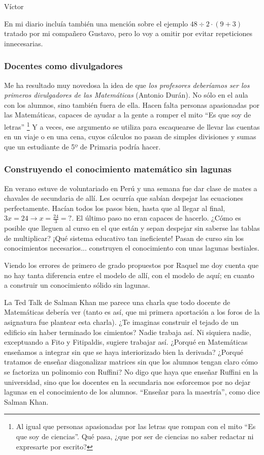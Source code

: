 \begin{opin}{\victorcolor}{Víctor}

En mi diario incluía también una mención sobre el ejemplo $48÷2·(9+3)$ tratado por mi compañero Gustavo, pero lo voy a omitir por evitar repeticiones innecesarias.

\subsubsection{Docentes como divulgadores}

Me ha resultado muy novedosa la idea de que \textit{los profesores deberíamos ser los primeros divulgadores de las Matemáticas} (Antonio Durán). 
%
No sólo en el aula con los alumnos, sino también fuera de ella.
%
Hacen falta personas apasionadas por las Matemáticas, capaces de ayudar a la gente a romper el mito ``Es que soy de letras'' 
%
\footnote{Al igual que personas apasionadas por las letras que rompan con el mito ``Es que soy de ciencias''. Qué pasa, ¿que por ser de ciencias no saber redactar ni expresarte por escrito?}
%
Y a veces, ese argumento se utiliza para escaquearse de llevar las cuentas en un viaje o en una cena, cuyos cálculos no pasan de simples divisiones y sumas que un estudiante de 5º de Primaria podría hacer.

\subsubsection{Construyendo el conocimiento matemático sin lagunas}

En verano estuve de voluntariado en Perú y una semana fue dar clase de mates a chavales de secundaria de allí. 
%
Les ocurría que sabían despejar las ecuaciones perfectamente. Hacían todos los pasos bien, hasta que al llegar al final, $3x = 24 \to x=\frac{24}{3} = ?$. 
%
El último paso no eran capaces de hacerlo. ¿Cómo es posible que lleguen al curso en el que están y sepan despejar sin saberse las tablas de multiplicar? 
%
¡Qué sistema educativo tan ineficiente! 
%
Pasan de curso sin los conocimientos necesarios... construyen el conocimiento con unas lagunas bestiales.

Viendo los errores de primero de grado propuestos por Raquel me doy cuenta que no hay tanta diferencia entre el modelo de allí, con el modelo de aquí; 
%
en cuanto a construir un conocimiento sólido sin lagunas.


La Ted Talk de Salman Khan me parece una charla que todo docente de Matemáticas debería ver (tanto es así, que mi primera aportación a los foros de la asignatura fue plantear esta charla).
%
¿Te imaginas construir el tejado de un edificio sin haber terminado los cimientos?
%
Nadie trabaja así. Ni siquiera nadie, exceptuando a Fito y Fitipaldis, sugiere trabajar así.
%
¿Porqué en Matemáticas enseñamos a integrar sin que se haya interiorizado bien la derivada? ¿Porqué tratamos de enseñar diagonalizar matrices sin que los alumnos tengan claro cómo se factoriza un polinomio con Ruffini?
%
No digo que haya que enseñar Ruffini en la universidad, sino que los docentes en la secundaria nos esforcemos por no dejar lagunas en el conocimiento de los alumnos. 
%
``Enseñar para la maestría'', como dice Salman Khan.


\end{opin}
